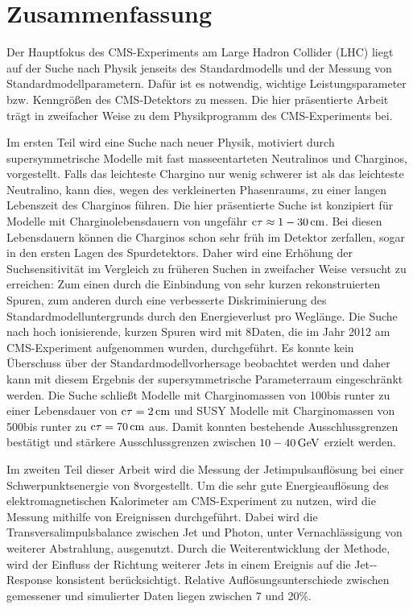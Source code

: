\chapter*{Zusammenfassung}
Der Hauptfokus des CMS-Experiments am Large Hadron Collider (LHC) liegt auf der Suche nach Physik jenseits des Standardmodells und der Messung von Standardmodellparametern.
Daf\"{u}r ist es notwendig, wichtige Leistungsparameter bzw. Kenngr\"{o}{\ss}en des CMS-Detektors zu messen.
Die hier pr\"{a}sentierte Arbeit tr\"{a}gt in zweifacher Weise zu dem Physikprogramm des CMS-Experiments bei.

Im ersten Teil wird eine Suche nach neuer Physik, motiviert durch supersymmetrische Modelle mit fast masseentarteten Neutralinos und Charginos, vorgestellt.
Falls das leichteste Chargino nur wenig schwerer ist als das leichteste Neutralino, kann dies, wegen des verkleinerten Phasenraums, zu einer langen Lebenszeit des Charginos f\"{u}hren.
Die hier pr\"{a}sentierte Suche ist konzipiert f\"{u}r Modelle mit Charginolebensdauern von ungef\"{a}hr $\text{c}\tau\approx 1-30\,\text{cm}$.
Bei diesen Lebensdauern können die Charginos schon sehr fr\"{u}h im Detektor zerfallen, sogar in den ersten Lagen des Spurdetektors.
Daher wird eine Erh\"{o}hung der Suchsensitivit\"{a}t im Vergleich zu fr\"{u}heren Suchen in zweifacher Weise versucht zu erreichen:
Zum einen durch die Einbindung von sehr kurzen rekonstruierten Spuren, zum anderen durch eine verbesserte Diskriminierung des Standardmodelluntergrunds durch den Energieverlust pro Wegl\"{a}nge.
Die Suche nach hoch ionisierende, kurzen Spuren wird mit 8\tev Daten, die im Jahr 2012 am CMS-Experiment aufgenommen wurden, durchgef\"{u}hrt.
Es konnte kein \"{U}berschuss \"{u}ber der Standardmodellvorhersage beobachtet werden und daher kann mit diesem Ergebnis der supersymmetrische Parameterraum eingeschr\"{a}nkt werden.
Die Suche schlie{\ss}t Modelle mit Charginomassen von 100\gev bis runter zu einer Lebensdauer von $\text{c}\tau=2\,\text{cm}$ und SUSY Modelle mit Charginomassen von 500\gev bis runter zu $\text{c}\tau=70\,\text{cm}$ aus.
Damit konnten bestehende Ausschlussgrenzen best\"{a}tigt und st\"{a}rkere Ausschlussgrenzen zwischen $10-40\,\text{Ge}\kern-0.06667em\text{V}$ erzielt werden.

Im zweiten Teil dieser Arbeit wird die Messung der Jetimpulsaufl\"{o}sung bei einer Schwerpunktsenergie von 8\tev vorgestellt.
Um die sehr gute Energieaufl\"{o}sung des elektromagnetischen Kalorimeter am CMS-Experiment zu nutzen, wird die Messung mithilfe von \GAMJET Ereignissen durchgef\"{u}hrt.
Dabei wird die Transversalimpulsbalance zwischen Jet und Photon, unter Vernachl\"{a}ssigung von weiterer Abstrahlung, ausgenutzt.
Durch die Weiterentwicklung der Methode, wird der Einfluss der Richtung weiterer Jets in einem Ereignis auf die Jet-\pt-Response konsistent ber\"{u}cksichtigt.
Relative Aufl\"{o}sungsunterschiede zwischen gemessener und simulierter Daten liegen zwischen 7 und 20\%.

\cleardoublepage
